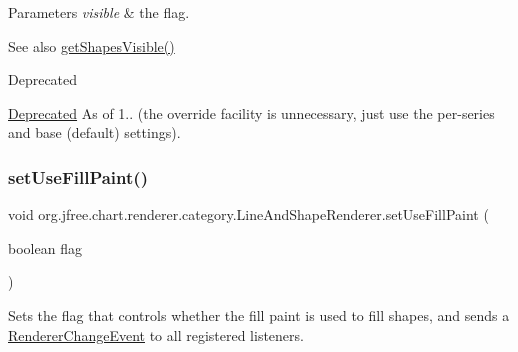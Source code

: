 \begin{DoxyParams}{Parameters}
{\em visible} & the flag.\\
\hline
\end{DoxyParams}
\begin{DoxySeeAlso}{See also}
\mbox{\hyperlink{classorg_1_1jfree_1_1chart_1_1renderer_1_1category_1_1_line_and_shape_renderer_a1b2c53ae8be56288c260b6da6fec348b}{get\+Shapes\+Visible()}}
\end{DoxySeeAlso}
\begin{DoxyRefDesc}{Deprecated}
\item[\mbox{\hyperlink{deprecated__deprecated000191}{Deprecated}}]As of 1.. (the override facility is unnecessary, just use the per-\/series and base (default) settings). \end{DoxyRefDesc}
\mbox{\label{classorg_1_1jfree_1_1chart_1_1renderer_1_1category_1_1_line_and_shape_renderer_ab3eb0245173ab97f09ab32375ed958ad}} 
\subsubsection{\texorpdfstring{set\+Use\+Fill\+Paint()}{setUseFillPaint()}}
{\footnotesize\ttfamily void org.\+jfree.\+chart.\+renderer.\+category.\+Line\+And\+Shape\+Renderer.\+set\+Use\+Fill\+Paint (\begin{DoxyParamCaption}\item[{boolean}]{flag }\end{DoxyParamCaption})}

Sets the flag that controls whether the fill paint is used to fill shapes, and sends a \mbox{\hyperlink{}{Renderer\+Change\+Event}} to all registered listeners.


